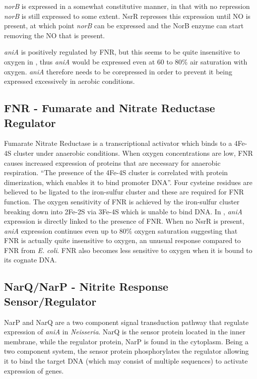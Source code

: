 \textit{norB} is expressed in a somewhat constitutive manner, in that with no repression \textit{norB} is still expressed to some extent\cite{Clark2010}. NsrR represses this expression until NO is present, at which point \textit{norB} can be expressed and the NorB enzyme can start removing the NO that is present.

\textit{aniA} is positively regulated by FNR, but this seems to be quite insensitive to oxygen in \Nm{}, thus \textit{aniA} would be expressed even at 60 to 80\% air saturation with oxygen\cite{Rock2007}. \textit{aniA} therefore needs to be corepressed in order to prevent it being expressed excessively in aerobic conditions.

\subsection{FNR - Fumarate and Nitrate Reductase Regulator}
Fumarate Nitrate Reductase is a transcriptional activator which binds to a 4Fe-4S cluster under anaerobic conditions. When oxygen concentrations are low, FNR causes increased expression of proteins that are necessary for anaerobic respiration. ``The presence of the 4Fe-4S cluster is correlated with protein dimerization, which enables it to bind promoter DNA''\cite{Edwards2010}. Four cysteine residues are believed to be ligated to the iron-sulfur cluster and these are required for FNR function. The oxygen sensitivity of FNR is achieved by the iron-sulfur cluster breaking down into 2Fe-2S via 3Fe-4S which is unable to bind DNA. In \Nm{}, \textit{aniA} expression is directly linked to the presence of FNR\cite{Rock2005}. When no NsrR is present, \textit{aniA} expression continues even up to 80\% oxygen saturation suggesting that FNR is actually quite insensitive to oxygen, an unusual response compared to FNR from \textit{E. coli}. FNR also becomes less sensitive to oxygen when it is bound to its cognate DNA\cite{Edwards2010}.

\subsection{NarQ/NarP - Nitrite Response Sensor/Regulator}
NarP and NarQ are a two component signal transduction pathway that regulate expression of \textit{aniA} in \textit{Neisseria}. NarQ is the sensor protein located in the inner membrane, while the regulator protein, NarP is found in the cytoplasm. Being a two component system, the sensor protein phosphorylates the regulator allowing it to bind the target DNA (which may consist of multiple sequences) to activate expression of genes.

